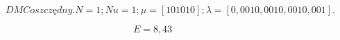 

\begin{figure}[H]
    \centering
    
    \caption{$DMC oszczędny. N = 1; Nu = 1; \mu = [10 10 10]; \lambda = [0,001 0,001 0,001 0,001].$}
\end{figure}

\begin{equation}
    E = 8,43
\end{equation}

%     



%     


%     


%     

